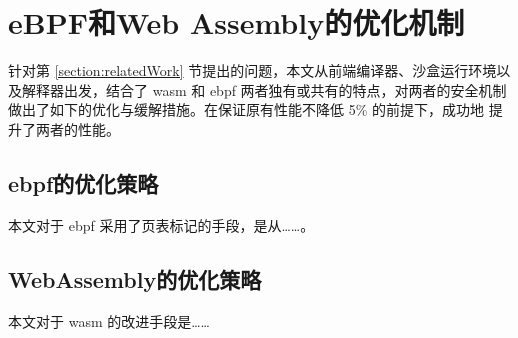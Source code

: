 \section{eBPF和Web Assembly的优化机制}
\label{section:optimizations}
    针对第 \ref{section:relatedWork} 节提出的问题，本文从前端编译器、沙盒运行环境以及解释器出发，结合了 wasm
    和 ebpf 两者独有或共有的特点，对两者的安全机制做出了如下的优化与缓解措施。在保证原有性能不降低 5\% 的前提下，成功地
    提升了两者的性能。
\subsection{ebpf的优化策略}
    本文对于 ebpf 采用了页表标记的手段，是从……。
\subsection{WebAssembly的优化策略}
    本文对于 wasm 的改进手段是……